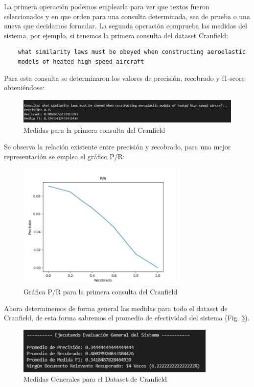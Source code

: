 \documentclass[runningheads,a4paper]{llncs}
\begin{document}
La primera operación podemos emplearla para ver que textos fueron seleccionados y en que orden para una consulta determinada, sea de prueba o una nueva que decidamos formular. La segunda operación comprueba las medidas del sistema, por ejemplo, si tenemos la primera consulta del dataset Cranfield: \\

\begin{verbatim}
	what similarity laws must be obeyed when constructing aeroelastic 
	models of heated high speed aircraft
\end{verbatim}

Para esta consulta se determinaron los valores de precisión, recobrado y f1-score obteniéndose:

\begin{figure}
	\centering
	\includegraphics[height=1.3cm]{imgs/eval_query1_cran.png}
	\caption{Medidas para la primera consulta del Cranfield}
	\label{fig:cran1}
\end{figure}

Se observa la relación existente entre precisión y recobrado, para una mejor representación se emplea el gráfico P/R:

\begin{figure}
	\centering
	\includegraphics[height=6.3cm]{imgs/pr_query1_cran.png}
	\caption{Gráfica P/R para la primera consulta del Cranfield}
	\label{fig:cran1img}
\end{figure}

Ahora determinemos de forma general las medidas para todo el dataset de Cranfield, de esta forma sabremos el promedio de efectividad del sistema (Fig. \ref{fig:cran1gen}).

\begin{figure}
	\centering
	\includegraphics[height=2.3cm]{imgs/eval_general_cran.png}
	\caption{Medidas Generales para el Dataset de Cranfield}
	\label{fig:cran1gen}
\end{figure}
\end{document}
